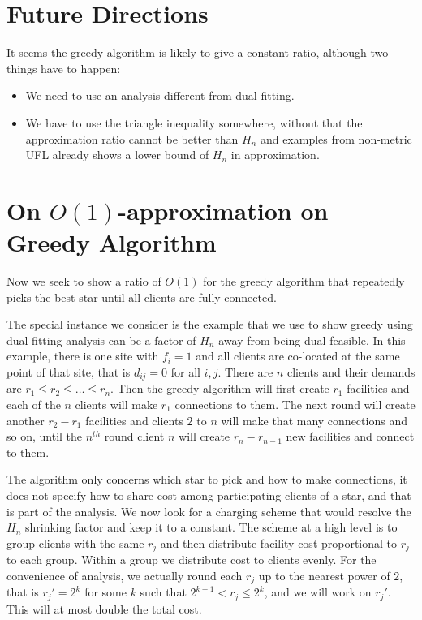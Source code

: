 \documentclass[11pt]{article}
\begin{document}
\section{Future Directions}
It seems the greedy algorithm is likely to give a constant ratio,
although two things have to happen:
\begin{itemize}
\item We need to use an analysis different from dual-fitting.
\item We have to use the triangle inequality somewhere, without that
  the approximation ratio cannot be better than $H_n$ and examples
  from non-metric UFL already shows a lower bound of $H_n$ in approximation.
\end{itemize}

\section{On $O(1)$-approximation on Greedy Algorithm}
Now we seek to show a ratio of $O(1)$ for the greedy algorithm that
repeatedly picks the best star until all clients are fully-connected.

The special instance we consider is the example that we use to show
greedy using dual-fitting analysis can be a factor of $H_n$ away from
being dual-feasible. In this example, there is one site with $f_i=1$
and all clients are co-located at the same point of that site, that is
$d_{ij}=0$ for all $i,j$. There are $n$ clients and their demands are
$r_1 \leq r_2 \leq \ldots \leq r_n$. Then the greedy algorithm will
first create $r_1$ facilities and each of the $n$ clients will make
$r_1$ connections to them. The next round will create another $r_2 -
r_1$ facilities and clients $2$ to $n$ will make that many connections
and so on, until the $n^{th}$ round client $n$ will create $r_n -
r_{n-1}$ new facilities and connect to them.

The algorithm only concerns which star to pick and how to make
connections, it does not specify how to share cost among participating
clients of a star, and that is part of the analysis. We now look for a
charging scheme that would resolve the $H_n$ shrinking factor and keep
it to a constant. The scheme at a high level is to group clients with
the same $r_j$ and then distribute facility cost proportional to $r_j$
to each group. Within a group we distribute cost to clients
evenly. For the convenience of analysis, we actually round each $r_j$
up to the nearest power of $2$, that is $r_j'=2^k$ for some $k$ such
that $2^{k-1} < r_j \leq 2^k$, and we will work on $r_j'$. This will
at most double the total cost.
\end{document}
